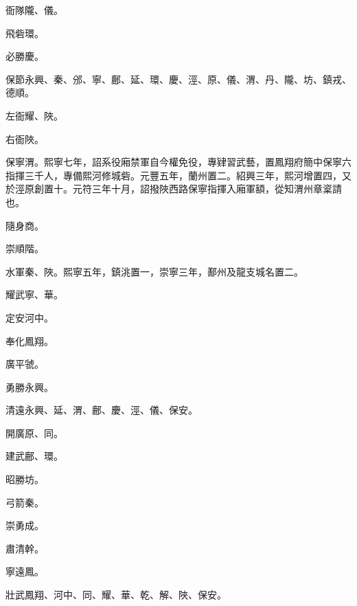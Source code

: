 \begin{pinyinscope}
 衙隊隴、儀。



 飛砦環。



 必勝慶。



 保節永興、秦、邠、寧、鄜、延、環、慶、涇、原、儀、渭、丹、隴、坊、鎮戎、德順。



 左衙耀、陜。



 右衙陜。



 保寧渭。熙寧七年，詔系役廂禁軍自今權免役，專肄習武藝，置鳳翔府簡中保寧六指揮三千人，專備熙河修城砦。元豐五年，蘭州置二。紹興三年，熙河增置四，又於涇原創置十。元符三年十月，詔撥陜西路保寧指揮入廂軍額，從知渭州章楶請也。



 隨身商。



 崇順階。



 水軍秦、陜。熙寧五年，鎮洮置一，崇寧三年，鄯州及龍支城名置二。



 耀武寧、華。



 定安河中。



 奉化鳳翔。



 廣平虢。



 勇勝永興。



 清遠永興、延、渭、鄜、慶、涇、儀、保安。



 開廣原、同。



 建武鄜、環。



 昭勝坊。



 弓箭秦。



 崇勇成。



 肅清幹。



 寧遠鳳。



 壯武鳳翔、河中、同、耀、華、乾、解、陜、保安。




\end{pinyinscope}
